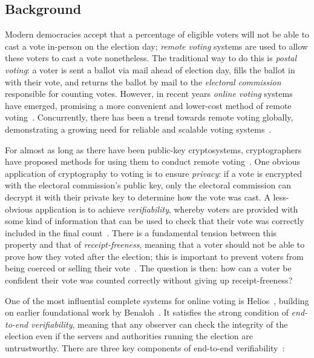 \documentclass[12pt,a4paper]{article}
\theoremstyle{definition}
\begin{document}
\subsection{Background}
Modern democracies accept that a percentage of eligible voters will not be able to cast a vote in-person on the election day; \textit{remote voting} systems are used to allow these voters to cast a vote nonetheless. The traditional way to do this is \textit{postal voting}: a voter is sent a ballot via mail ahead of election day, fills the ballot in with their vote, and returns the ballot by mail to the \textit{electoral commission} responsible for counting votes. However, in recent years \textit{online voting} systems have emerged, promising a more convenient and lower-cost method of remote voting~\cite{nswivote,scytlsvote}. Concurrently, there has been a trend towards remote voting globally, demonstrating a growing need for reliable and scalable voting systems~\cite{VEC_PostalVoting_Position,rallings2010,gjosteen2011norwegian}.

For almost as long as there have been public-key cryptosystems, cryptographers have proposed methods for using them to conduct remote voting~\cite{cohen1985robust}. One obvious application of cryptography to voting is to ensure \textit{privacy}: if a vote is encrypted with the electoral commission's public key, only the electoral commission can decrypt it with their private key to determine how the vote was cast. A less-obvious application is to achieve \textit{verifiability}, whereby voters are provided with some kind of information that can be used to check that their vote was correctly included in the final count~\cite{benaloh1987verifiable}. There is a fundamental tension between this property and that of \textit{receipt-freeness}, meaning that a voter should not be able to prove how they voted after the election; this is important to prevent voters from being coerced or selling their vote~\cite{benaloh1994receipt}. The question is then: how can a voter be confident their vote was counted correctly without giving up receipt-freeness?

One of the most influential complete systems for online voting is Helios~\cite{adida2008helios}, building on earlier foundational work by Benaloh~\cite{benaloh2006simple}. It satisfies the strong condition of \textit{end-to-end verifiability}, meaning that any observer can check the integrity of the election even if the servers and authorities running the election are untrustworthy. There are three key components of end-to-end verifiability~\cite{DBLP:journals/corr/BenalohRRSTV15}:
\end{document}
